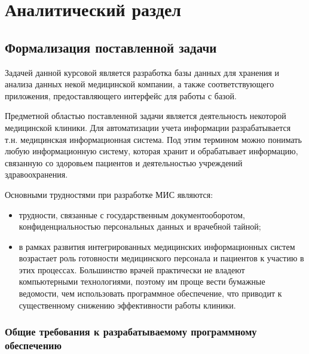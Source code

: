 \chapter{Аналитический раздел}
\label{cha:analysis}


\section{Формализация поставленной задачи}

Задачей данной курсовой является разработка базы данных для хранения и анализа данных некой медицинской компании, а также соответствующего приложения, предоставляющего интерфейс для работы с базой.

Предметной областью поставленной задачи является деятельность некоторой медицинской клиники. Для автоматизации учета информации разрабатывается т.н. медицинская информационная система. Под этим термином можно понимать любую информационную систему, которая хранит и обрабатывает информацию, связанную со здоровьем пациентов и деятельностью учреждений здравоохранения\cite{def}.

Основными трудностями при разработке МИС являются:

\begin{itemize}
	\item трудности, связанные с государственным документооборотом, конфиденциальностью персональных данных и врачебной тайной\cite{troubles};
	\item в рамках развития интегрированных медицинских информационных систем возрастает роль готовности медицинского персонала и пациентов к участию в этих процессах\cite{ready}. Большинство врачей практически не владеют компьютерными технологиями, поэтому им проще вести бумажные ведомости, чем использовать программное обеспечение, что приводит к существенному снижению эффективности работы клиники.
\end{itemize}

\clearpage
\subsection*{Общие требования к разрабатываемому программному обеспечению}

